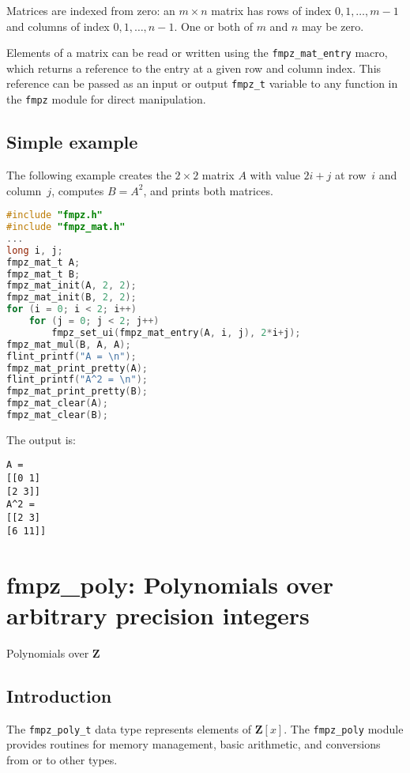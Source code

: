 \documentclass[a4paper,10pt]{book}
\newcommand{\Z}{\mathbf{Z}}%
\newcommand{\code}{\lstinline}
\begin{document}
{{Matrices are indexed from zero: an $m \times n$ matrix
has rows of index $0,1,\ldots,m-1$ and columns of
index $0,1,\ldots,n-1$. One or both of $m$ and $n$ may be zero.

Elements of a matrix can be read or written using the \code{fmpz_mat_entry}
macro, which returns a reference to the entry at a given row and column index.
This reference can be passed as an input or output \code{fmpz_t} variable to
any function in the \code{fmpz} module for direct manipulation.

\section{Simple example}
The following example creates the $2 \times 2$ matrix $A$ with
value $2i+j$ at row~$i$ and column~$j$, computes $B = A^2$,
and prints both matrices.

\begin{lstlisting}[language=c]
#include "fmpz.h"
#include "fmpz_mat.h"
...
long i, j;
fmpz_mat_t A;
fmpz_mat_t B;
fmpz_mat_init(A, 2, 2);
fmpz_mat_init(B, 2, 2);
for (i = 0; i < 2; i++)
    for (j = 0; j < 2; j++)
        fmpz_set_ui(fmpz_mat_entry(A, i, j), 2*i+j);
fmpz_mat_mul(B, A, A);
flint_printf("A = \n");
fmpz_mat_print_pretty(A);
flint_printf("A^2 = \n");
fmpz_mat_print_pretty(B);
fmpz_mat_clear(A);
fmpz_mat_clear(B);
\end{lstlisting}

The output is:
\begin{lstlisting}
A =
[[0 1]
[2 3]]
A^2 =
[[2 3]
[6 11]]
\end{lstlisting}





\chapter{fmpz\_poly: Polynomials over arbitrary precision integers}
\epigraph{Polynomials over $\Z$}{}

\section{Introduction}

The \code{fmpz_poly_t} data type represents elements of $\Z[x]$. The
\code{fmpz_poly} module provides routines for memory management, basic
arithmetic, and conversions from or to other types.

}}
\end{document}

